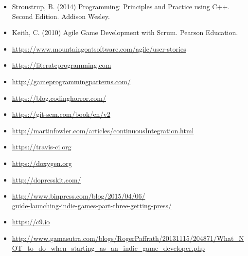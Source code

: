 \documentclass{../../fal_assignment}
\begin{document}
\begin{itemize}
    \item Stroustrup, B. (2014) Programming: Principles and Practice using C++. Second Edition. Addison Wesley.
    \item Keith, C. (2010) Agile Game Development with Scrum. Pearson Education.
    \item \url{https://www.mountaingoatsoftware.com/agile/user-stories}
    \item \url{https://literateprogramming.com}
    \item \url{http://gameprogrammingpatterns.com/}
    \item \url{https://blog.codinghorror.com/}
    \item \url{https://git-scm.com/book/en/v2}
    \item \url{http://martinfowler.com/articles/continuousIntegration.html}
    \item \url{https://travis-ci.org}
    \item \url{https://doxygen.org}
    \item \url{http://dopresskit.com/}
    \item \url{http://www.binpress.com/blog/2015/04/06/}\\ \url{guide-launching-indie-games-part-three-getting-press/}
    \item \url{https://c9.io}
    \item \url{http://www.gamasutra.com/blogs/RogerPaffrath/20131115/204871/What_NOT_to_do_when_starting_as_an_indie_game_developer.php}
\end{itemize}

\rubricyearthree
\end{document}
